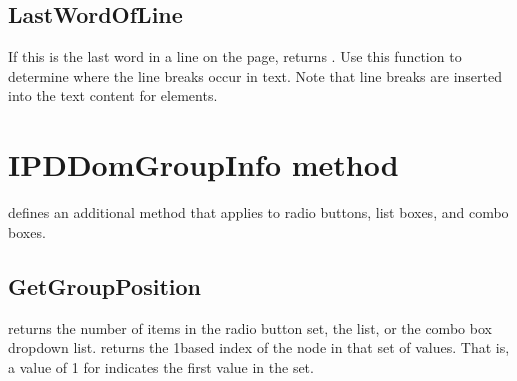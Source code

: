 \documentclass[letterpaper,12pt,english,openany,oneside]{sphinxmanual}
\begin{document}
\subsection{LastWordOfLine}
\label{\detokenize{Access_DOM:lastwordofline}}
If this is the last word in a line on the page,  returns  . Use this function to determine where the line breaks occur in text. Note that line breaks are inserted into the text content for elements.

\begin{sphinxVerbatim}[commandchars=\\\{\}]
   
\end{sphinxVerbatim}


\section{IPDDomGroupInfo method}
\label{\detokenize{Access_DOM:ipddomgroupinfo-method}}
 defines an additional method that applies to radio buttons, list boxes, and combo boxes.


\subsection{GetGroupPosition}
\label{\detokenize{Access_DOM:getgroupposition}}
 returns the number of items in the radio button set, the list, or the combo box drop\sphinxhyphen{}down list.  returns the 1\sphinxhyphen{}based index of the node in that set of values. That is, a value of 1 for  indicates the first value in the set.

\begin{sphinxVerbatim}[commandchars=\\\{\}]
    
\end{sphinxVerbatim}



\renewcommand{\indexname}{Index}
\printindex
\end{document}
